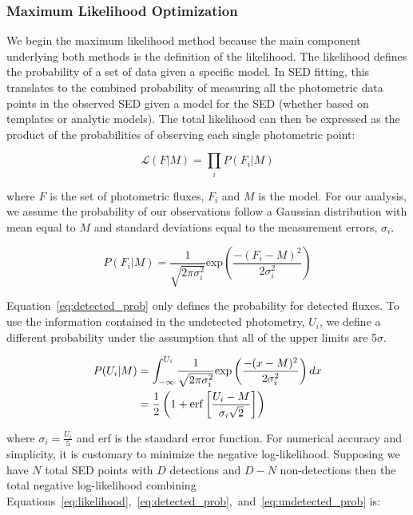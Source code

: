 \documentclass[fleqn,usenatbib]{mnras}
\begin{document}
\subsubsection{Maximum Likelihood Optimization}
We begin the maximum likelihood method because the main component underlying both methods is the definition of the likelihood. The likelihood defines the probability of a set of data given a specific model. In SED fitting, this translates to the combined probability of measuring all the photometric data points in the observed SED given a model for the SED (whether based on templates or analytic models). The total likelihood can then be expressed as the product of the probabilities of observing each single photometric point:

\begin{equation}\label{eq:likelihood}
\mathcal{L}(F|M) = \prod_{i}P(F_i|M)
\end{equation}

\noindent where $F$ is the set of photometric fluxes, $F_i$ and $M$ is the model. For our analysis, we assume the probability of our observations follow a Gaussian distribution with mean equal to $M$ and standard deviations equal to the measurement errors, $\sigma_{i}$.

\begin{equation}\label{eq:detected_prob}
P(F_i|M) = \frac{1}{\sqrt{2\pi\sigma_{i}^{2}}}\mathrm{exp}\left(\frac{-(F_i - M)^2}{2\sigma_i^2}\right)
\end{equation}

Equation~\ref{eq:detected_prob} only defines the probability for detected fluxes. To use the information contained in the undetected photometry, $U_i$, we define a different probability under the assumption that all of the upper limits are 5$\sigma$. 

\begin{align}\label{eq:undetected_prob}
P(U_i|M) &= \int_{-\infty}^{U_i}\frac{1}{\sqrt{2\pi\sigma_{i}^{2}}}\mathrm{exp}\left(\frac{-(x - M)^2}{2\sigma_i^2}\right)dx \notag\\
&= \frac{1}{2}\left(1 + \mathrm{erf}\left[\frac{U_i - M}{\sigma_i\sqrt{2}}\right]\right) 
\end{align}

\noindent where $\sigma_i = \frac{U_i}{5}$ and erf is the standard error function. For numerical accuracy and simplicity, it is customary to minimize the negative log-likelihood. Supposing we have $N$ total SED points with $D$ detections and $D-N$ non-detections then the total negative log-likelihood combining Equations~\ref{eq:likelihood},~\ref{eq:detected_prob},~and~\ref{eq:undetected_prob} is:
\end{document}
